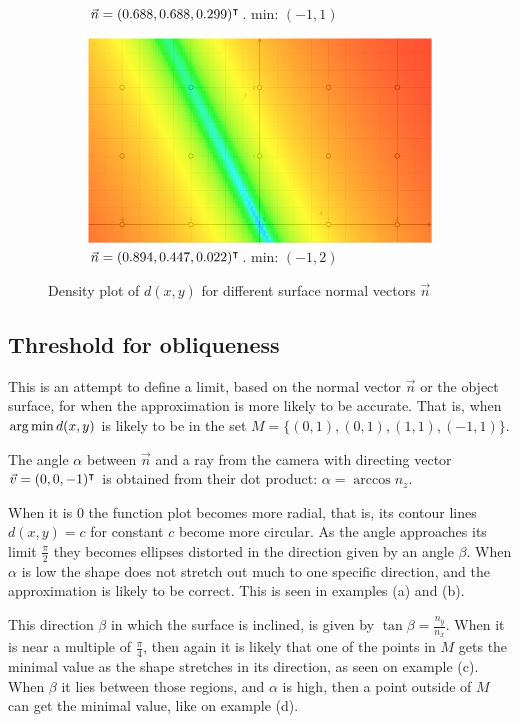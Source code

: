 \begin{figure}[h]
\begin{subfigure}{.48\textwidth}
	\caption{$\vec{n} = (0.688, 0.688, 0.299)^\intercal$. min: $(-1, 1)$}
\end{subfigure}%
\hfill%
\begin{subfigure}{.48\textwidth}
	\includegraphics[width=\linewidth]{fig/lmin/80-40-2.pdf}
	\caption{$\vec{n} = (0.894, 0.447, 0.022)^\intercal$. min: $(-1, 2)$}
\end{subfigure}
\caption{Density plot of $d(x, y)$ for different surface normal vectors $\vec{n}$}
\label{fig:lmin_d_func}
\end{figure}


\subsection{Threshold for obliqueness}
This is an attempt to define a limit, based on the normal vector $\vec{n}$ or the object surface, for when the approximation is more likely to be accurate. That is, when $\operatorname*{arg\,min} d(x, y)$ is likely to be in the set $M = \{ (0, 1), (0, 1), (1, 1), (-1, 1) \}$.

The angle $\alpha$ between $\vec{n}$ and a ray from the camera with directing vector $\vec{v} = (0, 0, -1)^\intercal$ is obtained from their dot product: $\alpha = \arccos n_z$. 

When it is $0$ the function plot becomes more radial, that is, its contour lines $d(x,y)=c$ for constant $c$ become more circular. As the angle approaches its limit $\frac{\pi}{2}$ they becomes ellipses distorted in the direction given by an angle $\beta$. When $\alpha$ is low the shape does not stretch out much to one specific direction, and the approximation is likely to be correct. This is seen in examples (a) and (b).

This direction $\beta$ in which the surface is inclined, is given by $\tan \beta = \frac{n_y}{n_x}$. When it is near a multiple of $\frac{\pi}{4}$, then again it is likely that one of the points in $M$ gets the minimal value as the shape stretches in its direction, as seen on example (c). When $\beta$ it lies between those regions, and $\alpha$ is high, then a point outside of $M$ can get the minimal value, like on example (d).

